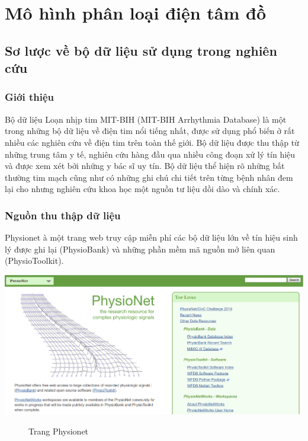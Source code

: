 \chapter{Mô hình phân loại điện tâm đồ }
\thispagestyle{fancy}

\section{Sơ lược về bộ dữ liệu sử dụng trong nghiên cứu}
\subsection{Giới thiệu}
Bộ dữ liệu Loạn nhịp tim MIT-BIH (MIT-BIH Arrhythmia Database) là một trong những bộ dữ liệu về điện tim nổi tiếng nhất, được sử dụng phổ biến ở rất nhiều các nghiên cứu về điện tim trên toàn thế giới. Bộ dữ liệu được thu thập từ những trung tâm y tế, nghiên cứu hàng đầu qua nhiều công đoạn xử lý tín hiệu và được xem xét bởi những y bác sĩ uy tín. Bộ dữ liệu thể hiện rõ những bất thường tim mạch cũng như có những ghi chú chi tiết trên từng bệnh nhân đem lại cho nhưng nghiên cứu khoa học một nguồn tư liệu dồi dào và chính xác.
\subsection{Nguồn thu thập dữ liệu}
Physionet à một trang web truy cập miễn phí các bộ dữ liệu lớn về tín hiệu sinh lý được ghi lại (PhysioBank) và những phần mềm mã nguồn mở liên quan (PhysioToolkit).
\begin{center}
    \includegraphics[scale=.3]{image/chapter2/Screenshot_from_2019-03-11_04-58-18.png}
    \begin{figure}[htp]
    \begin{center}
    \end{center}
    \caption{Trang Physionet}
    \end{figure}
\end{center}

